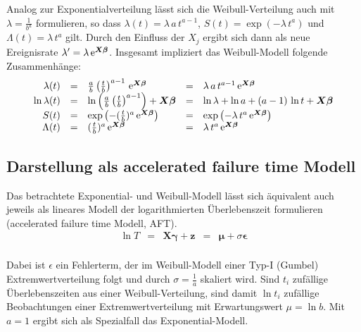 Analog zur Exponentialverteilung lässt sich die Weibull-Verteilung auch mit $\lambda = \frac{1}{b^{a}}$ formulieren, so dass $\lambda(t) = \lambda \, a \, t^{a-1}$, $S(t) = \exp(-\lambda \, t^{a})$ und $\Lambda(t) = \lambda \, t^{a}$ gilt. Durch den Einfluss der $X_{j}$ ergibt sich dann als neue Ereignisrate $\lambda' = \lambda \, {\mathrm{e}}^{\bm{X} \bm{\beta}}$. Insgesamt impliziert das Weibull-Modell folgende Zusammenhänge:
\begin{equation*}
\begin{array}{rclcl}
\lambda(t)     &=& \frac{a}{b} \left(\frac{t}{b}\right)^{a-1} \, {\mathrm{e}}^{\bm{X} \bm{\beta}} &=& \lambda \, a \, t^{a-1} \, {\mathrm{e}}^{\bm{X} \bm{\beta}}\\
\ln \lambda(t) &=& \ln \left(\frac{a}{b} \left(\frac{t}{b}\right)^{a-1}\right) + \bm{X} \bm{\beta} &=& \ln \lambda + \ln a + (a-1) \, \ln t + \bm{X} \bm{\beta}\\
S(t)           &=& \exp\left(-(\frac{t}{b})^{a} \, {\mathrm{e}}^{\bm{X} \bm{\beta}}\right) &=& \exp\left(-\lambda \, t^{a} \, {\mathrm{e}}^{\bm{X} \bm{\beta}}\right)\\
\Lambda(t)     &=& (\frac{t}{b})^{a} \, {\mathrm{e}}^{\bm{X} \bm{\beta}} &=& \lambda \, t^{a} \, {\mathrm{e}}^{\bm{X} \bm{\beta}}
\end{array}
\end{equation*}

\subsection{Darstellung als accelerated failure time Modell}

Das betrachtete Exponential- und Weibull-Modell lässt sich äquivalent auch jeweils als lineares Modell der logarithmierten Überlebenszeit formulieren (accelerated failure time Modell, AFT).
\begin{equation*}
\begin{array}{rclcl}
\ln T &=& \bm{X} \bm{\gamma} + \bm{z} &=& \bm{\mu} + \sigma \bm{\epsilon}\\
\end{array}
\end{equation*}

Dabei ist $\epsilon$ ein Fehlerterm, der im Weibull-Modell einer Typ-I (Gumbel) Extremwertverteilung folgt und durch $\sigma = \frac{1}{a}$ skaliert wird. Sind $t_{i}$ zufällige Überlebenszeiten aus einer Weibull-Verteilung, sind damit $\ln t_{i}$ zufällige Beobachtungen einer Extremwertverteilung mit Erwartungswert $\mu = \ln b$. Mit $a = 1$ ergibt sich als Spezialfall das Exponential-Modell.

